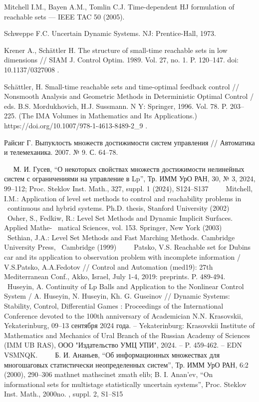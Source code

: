 \documentclass[../main.tex]{subfiles}
\begin{document}
\begin{thebibliography}{99}
Mitchell I.M., Bayen A.M., Tomlin C.J. Time-dependent HJ formulation of reachable sets — IEEE TAC 50 (2005).

Schweppe F.C. Uncertain Dynamic Systems. NJ: Prentice-Hall, 1973.

Krener A., Sch\"{a}ttler H. The structure of small-time reachable sets in low dimensions // SIAM J. Control Optim. 1989. Vol. 27, no. 1. P. 120–147. doi: 10.1137/0327008 .

Sch\"{a}ttler, H. Small-time reachable sets and time-optimal feedback control // Nonsmooth Analysis and Geometric Methods in Deterministic Optimal Control / eds. B.S. Mordukhovich, H.J. Sussmann.
N Y: Springer, 1996. Vol. 78. P. 203–225. (The IMA Volumes in Mathematics and Its Applications.)
https://doi.org/10.1007/978-1-4613-8489-2\_9 .

Райсиг Г. Выпуклость множеств достижимости систем управления // Автоматика и телемеханика. 2007. № 9. С. 64–78.

 М. И. Гусев, “О некоторых свойствах множеств достижимости нелинейных систем с ограничениями на управление в Lp”, Тр. ИММ УрО РАН, 30, № 3, 2024, 99–112; Proc. Steklov Inst. Math., 327, suppl. 1 (2024), S124–S137
 
 Mitchell, I.M.: Application of level set methods to control and reachability problems in
 continuous and hybrid systems. Ph.D. thesis, Stanford University (2002)
 
 Osher, S., Fedkiw, R.: Level Set Methods and Dynamic Implicit Surfaces. Applied Mathe-
 matical Sciences, vol. 153. Springer, New York (2003)
 
 Sethian, J.A.: Level Set Methods and Fast Marching Methods. Cambridge University Press,
 Cambridge (1999)
 
 Patsko, V.S. Reachable set for Dubins car and its application to observation problem with incomplete information / V.S.Patsko, A.A.Fedotov // Control and Automation (med19): 27th Mediterranean Conf., Akko, Israel, July 1-4, 2019: preprints. P. 489-494. 
 
 
 Huseyin, A. Continuity of Lp Balls and Application to the Nonlinear Control System / A. Huseyin, N. Huseyin, Kh. G. Guseinov // Dynamic Systems: Stability, Control, Differential Games : Proceedings of the International Conference devoted to the 100th anniversary of Academician N.N. Krasovskii, Yekaterinburg, 09–13 сентября 2024 года. – Yekaterinburg: Krasovskii Institute of Mathematics and Mechanics of Ural Branch of the Russian Academy of Sciences (IMM UB RAS), ООО "Издательство УМЦ УПИ", 2024. – P. 459-462. – EDN VSMNQK.
 
 Б. И. Ананьев, “Об информационных множествах для многошаговых статистически неопределенных систем”, Тр. ИММ УрО РАН, 6:2 (2000),  290–306  mathnet  mathscinet  zmath  elib; B. I. Anan'ev, “On informational sets for multistage statistically uncertain systems”, Proc. Steklov Inst. Math., 2000no. , suppl. 2, S1–S15
 


\end{thebibliography}
\end{document}
